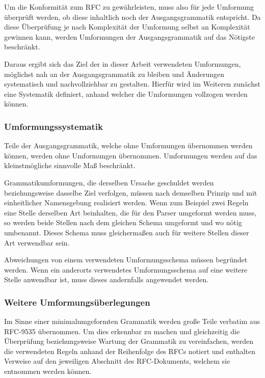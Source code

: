 \documentclass[oneside]{ausarbeitung}
\begin{document}
	Um die Konformität zum RFC zu gewährleisten, muss also für jede Umformung überprüft werden, ob diese inhaltlich noch der Ausgangsgrammatik entspricht. Da diese Überprüfung je nach Komplexität der Umformung selbst an Komplexität gewinnen kann, werden Umformungen der Ausgangsgrammatik auf das Nötigste beschränkt. 
	
	Daraus ergibt sich das Ziel der in dieser Arbeit verwendeten Umformungen, möglichst nah an der Ausgangsgrammatik zu bleiben und Änderungen systematisch und nachvollziehbar zu gestalten. Hierfür wird im Weiteren zunächst eine Systematik definiert, anhand welcher die Umformungen vollzogen werden können.
	
	\subsubsection{Umformungssystematik}
	
	Teile der Ausgangsgrammatik, welche ohne Umformungen übernommen werden können, werden ohne Umformungen übernommen. Umformungen werden auf das kleinstmögliche sinnvolle Maß beschränkt.
	
	Grammatikumformungen, die derselben Ursache geschuldet werden beziehungsweise dasselbe Ziel verfolgen, müssen nach demselben Prinzip und mit einheitlicher Namensgebung realisiert werden. Wenn zum Beispiel zwei Regeln eine Stelle derselben Art beinhalten, die für den Parser umgeformt werden muss, so werden beide Stellen nach dem gleichen Schema umgeformt und wo nötig umbenannt. Dieses Schema muss gleichermaßen auch für weitere Stellen dieser Art verwendbar sein.
	
	Abweichungen von einem verwendeten Umformungsschema müssen begründet werden. Wenn ein anderorts verwendetes Umformungsschema auf eine weitere Stelle anwendbar ist, muss dieses andernfalls angewendet werden. 
	
	\subsubsection{Weitere Umformungsüberlegungen}
	
	Im Sinne einer minimalumgeformten Grammatik werden große Teile verbatim aus RFC-9535 übernommen. Um dies erkennbar zu machen und gleichzeitig die Überprüfung beziehungsweise Wartung der Grammatik zu vereinfachen, werden die verwendeten Regeln anhand der Reihenfolge des RFCs notiert und enthalten Verweise auf den jeweiligen Abschnitt des RFC-Dokuments, welchem sie entnommen werden können. 
	
\end{document}
